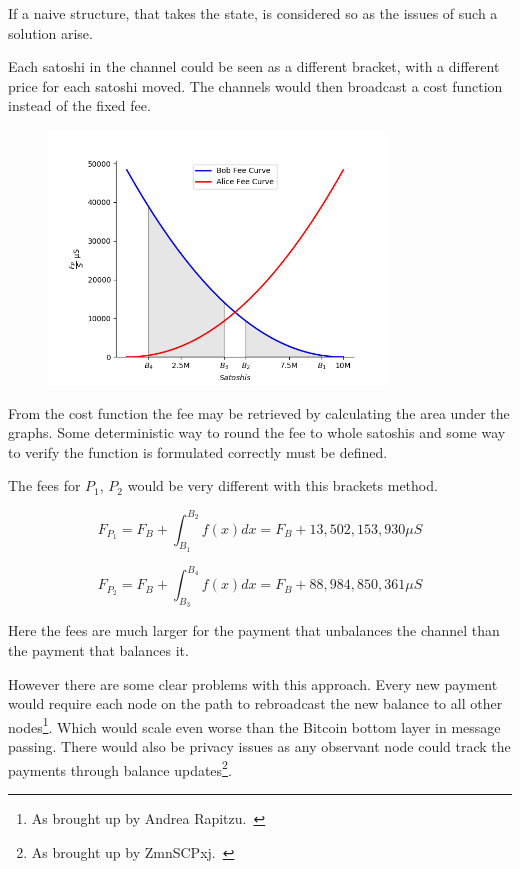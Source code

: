 If a naive structure, that takes the state, is considered so as the issues of such a solution arise. 

Each satoshi in the channel could be seen as a different bracket, with a different price for each satoshi moved. The channels would then broadcast a cost function instead of the fixed fee.

\begin{figure}[!htb]
	\hspace*{-0.5cm}
	\centering
	\includegraphics[width=9cm]{images/fee_scheme.png}
	\label{fig:fee scheme}
	\hspace{2mm}
\end{figure}

From the cost function the fee may be retrieved by calculating the area under the graphs. Some deterministic way to round the fee to whole satoshis and some way to verify the function is formulated correctly must be defined. 

The fees for $P_1$, $P_2$ would be very different with this brackets method.

\[ F_{P_1} = F_{B} + \int_{B_1}^{B_2} f(x) dx = F_B + 13,502,153,930 \mu S \] 

\[ F_{P_2} = F_{B} + \int_{B_3}^{B_4} f(x) dx  = F_B + 88,984,850,361 \mu S \]

Here the fees are much larger for the payment that unbalances the channel than the payment that balances it. 

However there are some clear problems with this approach. Every new payment would require each node on the path to rebroadcast the new balance to all other nodes\footnote{As brought up by Andrea Rapitzu.~\cite{raspitzu:fee}}. Which would scale even worse than the Bitcoin bottom layer in message passing. There would also be privacy issues as any observant node could track the payments through balance updates\footnote{As brought up by ZmnSCPxj.~\cite{ZmnSCPxj:fee}}.

